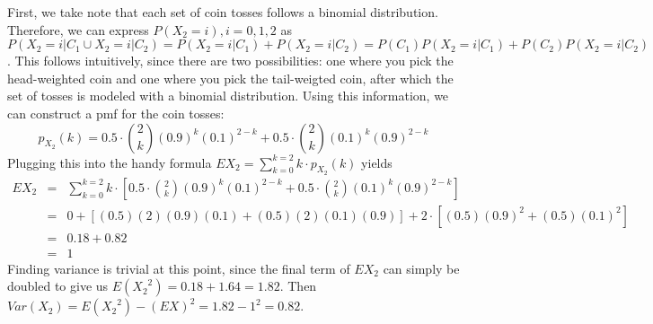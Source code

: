 \documentclass{article}
\begin{document}
First, we take note that each set of coin tosses follows a binomial
distribution. Therefore, we can express $P( X_2 = i ), i = 0,1,2$ as $P( X_2 =
i | C_1 \cup X_2 = i | C_2 ) = P( X_2 = i | C_1 ) + P( X_2 = i | C_2 ) = P(
C_1) P( X_2 = i | C_1 ) + P( C_2 )P( X_2 = i | C_2 )$. This follows
intuitively, since there are two possibilities: one where you pick the
head-weighted coin and one where you pick the tail-weigted coin, after which
the set of tosses is modeled with a binomial distribution. Using this
information, we can construct a pmf for the coin tosses:
\begin{equation*}
  p_{X_2}(k) = 0.5\cdot\binom{2}{k}(0.9)^k(0.1)^{2 - k} +
  0.5\cdot\binom{2}{k}(0.1)^k(0.9)^{2 - k}
\end{equation*}
Plugging this into the handy formula $EX_2 = \sum\limits_{k=0}^{k=2} k\cdot
p_{X_2}(k)$ yields
\begin{eqnarray*}
  EX_2 &=& \sum\limits_{k=0}^{k=2}
  k\cdot\left[0.5\cdot\binom{2}{k}(0.9)^k(0.1)^{2 - k} +
  0.5\cdot\binom{2}{k}(0.1)^k(0.9)^{2 - k}\right] \\
  &=& 0 + \left[(0.5)(2)(0.9)(0.1) + (0.5)(2)(0.1)(0.9)\right] +
  2\cdot\left[(0.5)(0.9)^2 + (0.5)(0.1)^2\right] \\
  &=& 0.18 + 0.82 \\
  &=& 1
\end{eqnarray*}
Finding variance is trivial at this point, since the final term of $EX_2$ can
simply be doubled to give us $E({X_2}^2) = 0.18 + 1.64 = 1.82$. Then $Var(X_2) =
E({X_2}^2) - (EX)^2 = 1.82 - 1^2 = 0.82$.
\end{document}
